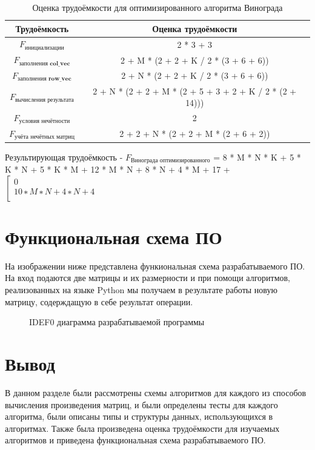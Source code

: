 \begin{table}[h!]
  \begin{center}
    \captionsetup{justification=raggedright}
    \caption{Оценка трудоёмкости для оптимизированного алгоритма Винограда}
    \label{tab:workcost_classic}
    \begin{tabular}{c|c}
      \textbf{Трудоёмкость} & \textbf{Оценка трудоёмкости}\\
      \hline
	$F_{\textbf{инициализации}}$ & 2 * 3 + 3\\
	$F_{\textbf{заполнения col\_vec}}$ & 2 + M * (2 + 2 + K / 2 * (3 + 6 + 6))\\
	$F_{\textbf{заполнения row\_vec}}$ & 2 + N * (2 + 2 + K / 2 * (3 + 6 + 6))\\
	$F_{\textbf{вычисления результата}}$ &2 + N * (2 + 2 + M * (2 + 5 + 3 + 2 + K / 2 * (2 + 14)))\\
	$F_{\textbf{условия нечётности}}$ & 2\\
	$F_{\textbf{учёта нечётных матриц}}$ & 2 + 2 + N * (2 + 2 + M * (2 + 6 + 2))
    \end{tabular}
  \end{center}
\end{table}
Результирующая трудоёмкость - $F_{\text{Винограда оптимизированного}}$ = 8 * M * N * K + 5 * K * N + 5 * K * M + 12 * M * N
+ 8 * N + 4 * M + 17 +
$\left[ 
  \begin{array}{c}
    0 \\
    10 ∗ M ∗ N + 4 ∗ N + 4 \\
  \end{array}
\right.$
\newpage

\section{Функциональная схема ПО}
На изображении ниже представлена функиональная схема разрабатываемого ПО. На вход подаются две матрицы и их размерности и при помощи алгоритмов, реализованных на языке Python мы получаем в результате работы новую матрицу, содерждащую в себе результат операции.

\newpage

\begin{figure}[ph!]
	\caption{IDEF0 диаграмма разрабатываемой программы}
\end{figure}

\section{Вывод}
В данном разделе были рассмотрены схемы алгоритмов для каждого из способов вычисления произведения матриц, и были определены тесты для каждого алгоритма, были описаны типы и структуры данных, использующихся в алгоритмах. Также была произведена оценка трудоёмкости для изучаемых алгоритмов и приведена функциональная схема разрабатываемого ПО.

